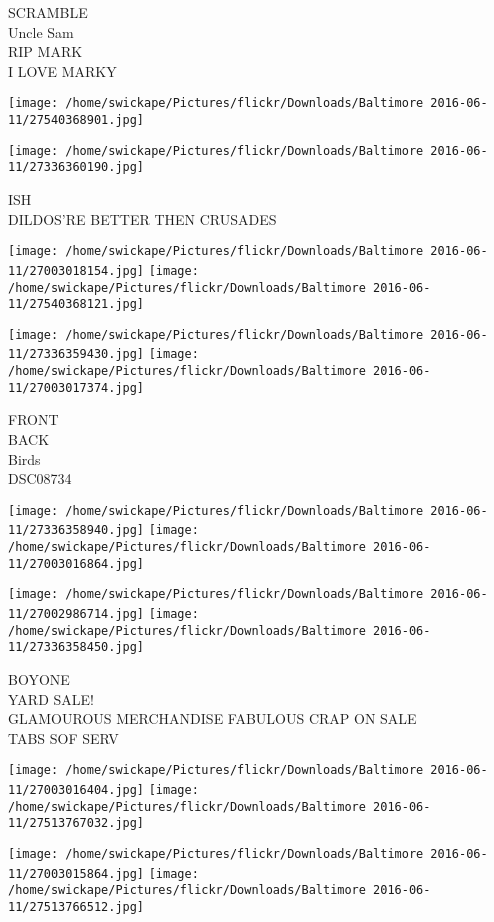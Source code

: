 \documentclass[10pt,letterpaper]{article}
\begin{document}
SCRAMBLE\\
Uncle Sam\\
RIP MARK\\
I LOVE MARKY
\pagebreak

\texttt{[image: /home/swickape/Pictures/flickr/Downloads/Baltimore 2016-06-11/27540368901.jpg]}

\vspace{0.25in}
\texttt{[image: /home/swickape/Pictures/flickr/Downloads/Baltimore 2016-06-11/27336360190.jpg]}

ISH\\
DILDOS'RE BETTER THEN CRUSADES
\pagebreak

\texttt{[image: /home/swickape/Pictures/flickr/Downloads/Baltimore 2016-06-11/27003018154.jpg]}
\texttt{[image: /home/swickape/Pictures/flickr/Downloads/Baltimore 2016-06-11/27540368121.jpg]}

\texttt{[image: /home/swickape/Pictures/flickr/Downloads/Baltimore 2016-06-11/27336359430.jpg]}
\texttt{[image: /home/swickape/Pictures/flickr/Downloads/Baltimore 2016-06-11/27003017374.jpg]}

FRONT\\
BACK\\
Birds\\
DSC08734
\pagebreak

\texttt{[image: /home/swickape/Pictures/flickr/Downloads/Baltimore 2016-06-11/27336358940.jpg]}
\texttt{[image: /home/swickape/Pictures/flickr/Downloads/Baltimore 2016-06-11/27003016864.jpg]}

\texttt{[image: /home/swickape/Pictures/flickr/Downloads/Baltimore 2016-06-11/27002986714.jpg]}
\texttt{[image: /home/swickape/Pictures/flickr/Downloads/Baltimore 2016-06-11/27336358450.jpg]}

BOYONE\\
YARD SALE!\\
GLAMOUROUS MERCHANDISE FABULOUS CRAP ON SALE\\
TABS SOF SERV
\pagebreak

\texttt{[image: /home/swickape/Pictures/flickr/Downloads/Baltimore 2016-06-11/27003016404.jpg]}
\texttt{[image: /home/swickape/Pictures/flickr/Downloads/Baltimore 2016-06-11/27513767032.jpg]}

\texttt{[image: /home/swickape/Pictures/flickr/Downloads/Baltimore 2016-06-11/27003015864.jpg]}
\texttt{[image: /home/swickape/Pictures/flickr/Downloads/Baltimore 2016-06-11/27513766512.jpg]}
\end{document}
